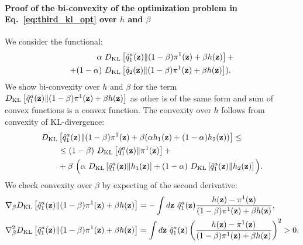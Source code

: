 \paragraph{Proof of the bi-convexity of the optimization problem in Eq.~\ref{eq:third_kl_opt} over $h$ and $\beta$}
We consider the functional:
\begin{equation}
    \begin{aligned}
     \alpha~&D_{\mathrm{KL}}\left[\hat{q}_{1}^{a}({\mathbf{z}})\|(1-\beta)\pi^{1}({\mathbf{z}})+\beta h({\mathbf{z}})\right] + \\
    + (1-\alpha)~&D_{\mathrm{KL}}\left[\hat{q}_{2}({\mathbf{z}})\|(1-\beta)\pi^{1}({\mathbf{z}})+\beta h({\mathbf{z}})\right]).
    \end{aligned}
\end{equation}
We show bi-convexity over $h$ and $\beta$ for the term $D_{\mathrm{KL}}\left[\hat{q}_{1}^{a}({\mathbf{z}})\|(1-\beta)\pi^{1}({\mathbf{z}})+\beta h({\mathbf{z}})\right]$ as other is of the same form and sum of convex functions is a convex function. The convexity over $h$ follows from convexity of KL-divergence:
\begin{equation}
    \begin{aligned}
     &D_{\mathrm{KL}}\left[\hat{q}_{1}^{a}({\mathbf{z}})\|(1-\beta)\pi^{1}({\mathbf{z}})+\beta(\alpha h_1({\mathbf{z}}) + (1-\alpha)h_2({\mathbf{z}}))\right] \leq \\
   &\quad\quad  \leq  (1-\beta)~D_{\mathrm{KL}}\left[\hat{q}_{1}^{a}({\mathbf{z}})\|\pi^{1}({\mathbf{z}})\right] + \\
   &\quad\quad +  \beta~\Big(\alpha ~D_{\mathrm{KL}}\left[\hat{q}_{1}^{a}({\mathbf{z}})\|h_1({\mathbf{z}})\right] + (1-\alpha)~D_{\mathrm{KL}}\left[\hat{q}_{1}^{a}({\mathbf{z}})\|h_2({\mathbf{z}})\right]\Big).
    \end{aligned}
\end{equation}
We check convexity over $\beta$ by expecting of the second derivative:
\begin{equation*}
    \begin{aligned}
    & \nabla_{\beta} D_{\mathrm{KL}}\left[\hat{q}_{1}^{a}({\mathbf{z}})\|(1-\beta)\pi^{1}({\mathbf{z}})+\beta h({\mathbf{z}})\right] = - \int d{\mathbf{z}}~\hat{q}_{1}^{a}({\mathbf{z}})\frac{h({\mathbf{z}})-\pi^{1}({\mathbf{z}})}{(1-\beta)\pi^{1}({\mathbf{z}})+\beta h({\mathbf{z}})}, \\
    & \nabla^{2}_{\beta}D_{\mathrm{KL}}\left[\hat{q}_{1}^{a}({\mathbf{z}})\|(1-\beta)\pi^{1}({\mathbf{z}})+\beta h({\mathbf{z}})\right] = \int d{\mathbf{z}}~\hat{q}_{1}^{a}({\mathbf{z}}) \left(\frac{h({\mathbf{z}})-\pi^{1}({\mathbf{z}})}{(1-\beta)\pi^{1}({\mathbf{z}})+\beta h({\mathbf{z}})}\right)^2 > 0.
    \end{aligned}
\end{equation*}
